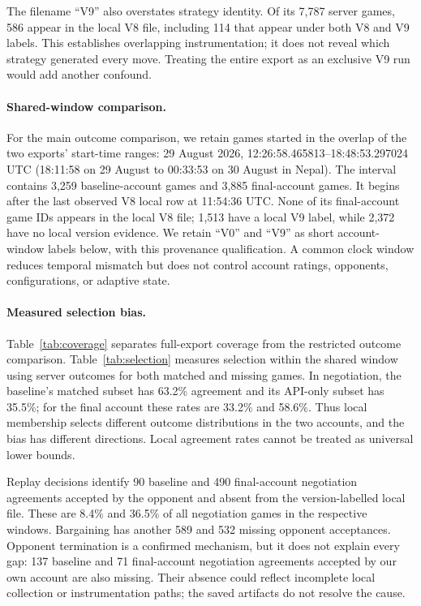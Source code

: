 \documentclass{article}
\begin{document}
The filename ``V9'' also overstates strategy identity. Of its 7,787 server games, 586 appear in the local V8 file, including 114 that appear under both V8 and V9 labels. This establishes overlapping instrumentation; it does not reveal which strategy generated every move. Treating the entire export as an exclusive V9 run would add another confound.

\paragraph{Shared-window comparison.}
For the main outcome comparison, we retain games started in the overlap of the two exports' start-time ranges: 29 August 2026, 12:26:58.465813--18:48:53.297024 UTC (18:11:58 on 29 August to 00:33:53 on 30 August in Nepal). The interval contains 3,259 baseline-account games and 3,885 final-account games. It begins after the last observed V8 local row at 11:54:36 UTC. None of its final-account game IDs appears in the local V8 file; 1,513 have a local V9 label, while 2,372 have no local version evidence. We retain ``V0'' and ``V9'' as short account-window labels below, with this provenance qualification. A common clock window reduces temporal mismatch but does not control account ratings, opponents, configurations, or adaptive state.



\paragraph{Measured selection bias.}
Table~\ref{tab:coverage} separates full-export coverage from the restricted outcome comparison. Table~\ref{tab:selection} measures selection within the shared window using server outcomes for both matched and missing games. In negotiation, the baseline's matched subset has 63.2\% agreement and its API-only subset has 35.5\%; for the final account these rates are 33.2\% and 58.6\%. Thus local membership selects different outcome distributions in the two accounts, and the bias has different directions. Local agreement rates cannot be treated as universal lower bounds.

Replay decisions identify 90 baseline and 490 final-account negotiation agreements accepted by the opponent and absent from the version-labelled local file. These are 8.4\% and 36.5\% of all negotiation games in the respective windows. Bargaining has another 589 and 532 missing opponent acceptances. Opponent termination is a confirmed mechanism, but it does not explain every gap: 137 baseline and 71 final-account negotiation agreements accepted by our own account are also missing. Their absence could reflect incomplete local collection or instrumentation paths; the saved artifacts do not resolve the cause.
\end{document}
